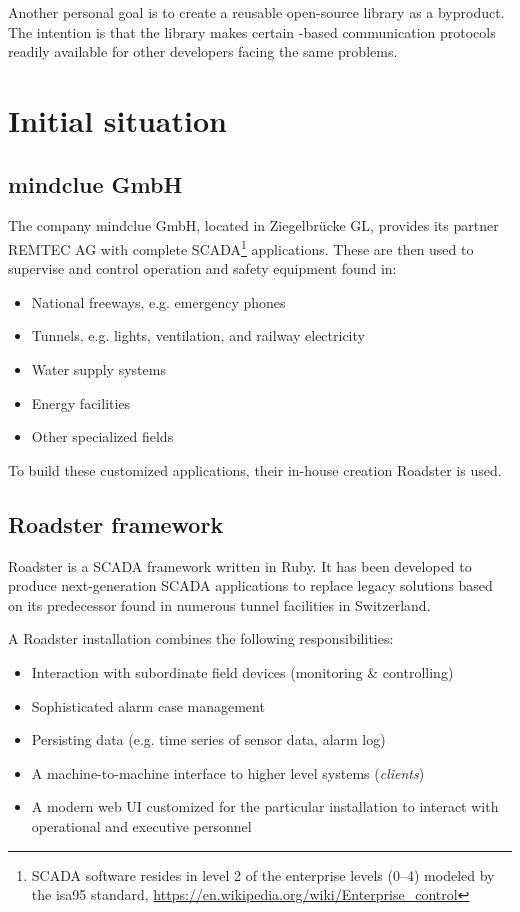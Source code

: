 Another personal goal is to create a reusable open-source library as a
byproduct. The intention is that the library makes certain \zmq-based
communication protocols readily available for other developers facing the same
problems.

\section{Initial situation}

\subsection{mindclue GmbH}
The company mindclue GmbH, located in Ziegelbr\"ucke GL, provides its partner
REMTEC AG with complete \gls{SCADA}\footnote{SCADA software resides in level 2 of the enterprise levels (0--4) modeled by the \gls{isa95} standard, \url{https://en.wikipedia.org/wiki/Enterprise_control}} applications. These are then used to
supervise and control operation and safety equipment found in:

\begin{itemize}
\item National freeways, e.g. emergency phones
\item Tunnels, e.g. lights, ventilation, and railway electricity
\item Water supply systems
\item Energy facilities
\item Other specialized fields
\end{itemize}

To build these customized applications, their in-house creation
Roadster is used.

\subsection{Roadster framework}
Roadster is a SCADA framework written in Ruby. It has been developed to
produce next-generation SCADA applications to replace legacy
solutions based on its predecessor found in numerous tunnel
facilities in Switzerland.

A Roadster installation combines the following responsibilities:

\begin{itemize}
	\item Interaction with subordinate field devices (monitoring \& controlling)
	\item Sophisticated alarm case management
	\item Persisting data (e.g. time series of sensor data, alarm log)
	\item A machine-to-machine interface to higher level systems (\emph{clients})
	\item A modern web UI customized for the particular installation to interact with operational and executive personnel
\end{itemize}

